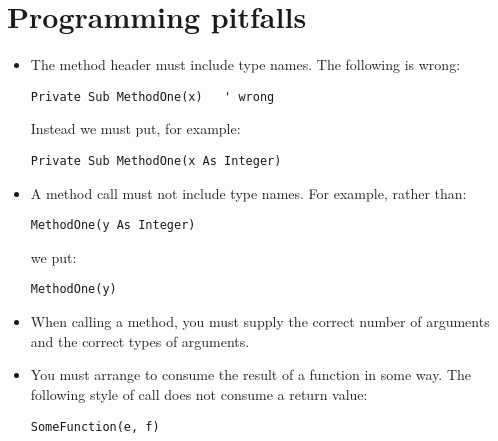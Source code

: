 	\section{Programming pitfalls}
	\begin{itemize}
		\item The method header must include type names. The following is wrong:
			\begin{lstlisting}
Private Sub MethodOne(x)   ' wrong
			\end{lstlisting}
			Instead we must put, for example:
			\begin{lstlisting}
Private Sub MethodOne(x As Integer)
			\end{lstlisting}
		\item A method call must not include type names. For example, rather than:
			\begin{lstlisting}
MethodOne(y As Integer)
			\end{lstlisting}
	we put:
			\begin{lstlisting}
MethodOne(y)
			\end{lstlisting}
		\item When calling a method, you must supply the correct number of arguments and the correct types of arguments.
		\item You must arrange to consume the result of a function in some way. The following style of call does not consume a return value:
			\begin{lstlisting}
SomeFunction(e, f)
			\end{lstlisting}
		\end{itemize}


